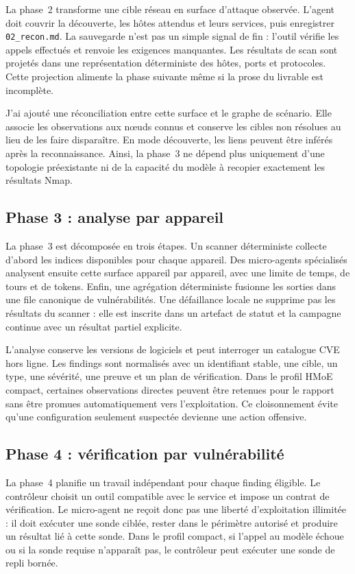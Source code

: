 La phase~2 transforme une cible réseau en surface d'attaque observée. L'agent
doit couvrir la découverte, les hôtes attendus et leurs services, puis enregistrer
\texttt{\footnotesize 02\_recon.md}. La sauvegarde n'est pas un simple signal de fin : l'outil
vérifie les appels effectués et renvoie les exigences manquantes. Les résultats
de scan sont projetés dans une représentation déterministe des hôtes, ports et
protocoles. Cette projection alimente la phase suivante même si la prose du
livrable est incomplète.

J'ai ajouté une réconciliation entre cette surface et le graphe de scénario.
Elle associe les observations aux nœuds connus et conserve les cibles non
résolues au lieu de les faire disparaître. En mode découverte, les liens peuvent
être inférés après la reconnaissance. Ainsi, la phase~3 ne dépend plus uniquement
d'une topologie préexistante ni de la capacité du modèle à recopier exactement
les résultats Nmap.

\subsection{Phase 3 : analyse par appareil}

La phase~3 est décomposée en trois étapes. Un scanner déterministe collecte
d'abord les indices disponibles pour chaque appareil. Des micro-agents spécialisés
analysent ensuite cette surface appareil par appareil, avec une limite de temps,
de tours et de tokens. Enfin, une agrégation déterministe fusionne les sorties
dans une file canonique de vulnérabilités. Une défaillance locale ne supprime pas
les résultats du scanner : elle est inscrite dans un artefact de statut et la
campagne continue avec un résultat partiel explicite.

L'analyse conserve les versions de logiciels et peut interroger un catalogue CVE
hors ligne. Les findings sont normalisés avec un identifiant stable, une cible,
un type, une sévérité, une preuve et un plan de vérification. Dans le profil HMoE
compact, certaines observations directes peuvent être retenues pour le rapport
sans être promues automatiquement vers l'exploitation. Ce cloisonnement évite
qu'une configuration seulement suspectée devienne une action offensive.

\subsection{Phase 4 : vérification par vulnérabilité}

La phase~4 planifie un travail indépendant pour chaque finding éligible. Le
contrôleur choisit un outil compatible avec le service et impose un contrat de
vérification. Le micro-agent ne reçoit donc pas une liberté d'exploitation
illimitée : il doit exécuter une sonde ciblée, rester dans le périmètre autorisé
et produire un résultat lié à cette sonde. Dans le profil compact, si l'appel au
modèle échoue ou si la sonde requise n'apparaît pas, le contrôleur peut exécuter
une sonde de repli bornée.

